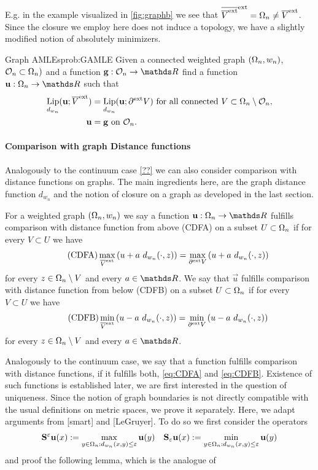 %
E.g. in the example visualized in \cref{fig:graphb} we see that $\overline{\overline{V}^{\text{ext}}}^{\text{ext}}=\Omega_n\neq \overline{V}^{\text{ext}}$. Since the closure we employ here does not induce a topology, we have a slightly modified notion of absolutely minimizers.
%
\begin{problem}{Graph AMLEs}{prob:GAMLE}
Given a connected weighted graph $(\Omega_n, w_n)$, $\mathcal{O}_n\subset\Omega_n)$ and a function $\vec g:\conset_n\to\R$ find a function $\vec u:\domain_n\to\R$ such that
%
\begin{align*}
\operatorname*{Lip}_{d_{w_n}}(\mathbf{u}; \overline{V}^{\text{ext}}) &= \operatorname*{Lip}_{d_{w_n}}(\mathbf{u}; \partial^{\text{ext}} V)
\text{ for all connected } V\subset \Omega_n\setminus\mathcal{O}_n,\\
\mathbf{u} &= \mathbf{g}\text{ on } \mathcal{O}_n.
\end{align*}
\end{problem}
%
%
%
\paragraph{Comparison with graph Distance functions}
%
Analogously to the continuum case \cref{??} we can also consider comparison with distance functions on graphs. The main ingredients here, are the graph distance function $d_{w_n}$ and the notion of closure on a graph as developed in the last section.
%
%
\begin{definition}{}{}
For a weighted graph $(\Omega_n,w_n)$ we say a function $\vec u:\domain_n\to\R$ fulfills comparison with distance function from above (CDFA) on a subset $U\subset \Omega_n$ if for every $V\subset U$ we have
%
\begin{align}\label{eq:CDFA}\tag{CDFA}
\max_{\overline{V}^{\text{ext}}} \left(u + a\ d_{w_n}(\cdot, z)\right)=
\max_{\partial^{\text{ext}} V} \left(u + a\ d_{w_n}(\cdot, z)\right)
\end{align}
%
for every $z\in \Omega_n\setminus V$ and every $a\in\R$. We say that $\vec u$ fulfills comparison with distance function from below (CDFB) on a subset $U\subset \Omega_n$ if for every $V\subset U$ we have
%
\begin{align}\label{eq:CDFB}\tag{CDFB}
\min_{\overline{V}^{\text{ext}}} \left(u - a\ d_{w_n}(\cdot, z)\right)=
\min_{\partial^{\text{ext}} V} \left(u - a\ d_{w_n}(\cdot, z)\right)
\end{align}
%
for every $z\in \Omega_n\setminus V$ and every $a\in\R$.
\end{definition}
%
%
Analogously to the continuum case, we say that a function fulfills comparison with distance functions, if it fulfills both, \cref{eq:CDFA} and \cref{eq:CDFB}. Existence of such functions is established later, we are first interested in the question of uniqueness. Since the notion of graph boundaries is not directly compatible with the usual definitions on metric spaces, we prove it separately. Here, we adapt arguments from [smart] and [LeGruyer]. To do so we first consider the operators
%
\def\eps{\varepsilon}
\begin{align*}
\vec S^\eps \vec u (x) := \max_{y\in\domain_n: d_{w_n}(x,y)\leq \eps} \vec u(y) \quad
\vec S_\eps \vec u (x) := \min_{y\in\domain_n: d_{w_n}(x,y)\leq \eps} \vec u(y)
\end{align*}
%
and proof the following lemma, which is the analogue of 

